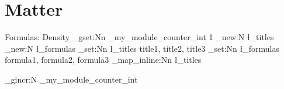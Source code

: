 \documentclass[../../main.tex]{subfiles}
\begin{document}
\chapter{Matter}

\begin{boxBox}{Formulas: Density}
	\ExplSyntaxOn
	\int_gset:Nn \g_my_module_counter_int {1}
	\clist_new:N \l_titles
	\clist_new:N \l_formulas
	\clist_set:Nn \l_titles { title1, title2, title3 }
	\clist_set:Nn \l_formulas { formula1, formula2, formula3 }
	\clist_map_inline:Nn \l_titles {

		\begin{multicols}{2}

	\end{multicols}
	\int_gincr:N \g_my_module_counter_int

}
	\ExplSyntaxOff
\end{boxBox}
\end{document}
